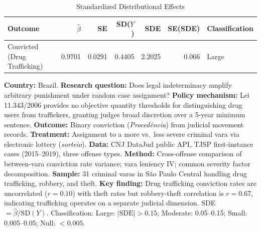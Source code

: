 \begin{table}[!h]
\centering
\caption{\label{tab:sde}Standardized Distributional Effects}
\centering
\begin{tabular}[t]{lrrrrrl}
\toprule
Outcome & $\hat{\beta}$ & SE & SD($Y$) & SDE & SE(SDE) & Classification\\
\midrule
Convicted (Drug Trafficking) & 0.9701 & 0.0291 & 0.4405 & 2.2025 & 0.066 & Large\\
\bottomrule
\end{tabular}
\end{table}
\begin{flushleft}\small
\textbf{Country:} Brazil. \textbf{Research question:} Does legal indeterminacy amplify arbitrary punishment under random case assignment? \textbf{Policy mechanism:} Lei 11.343/2006 provides no objective quantity thresholds for distinguishing drug users from traffickers, granting judges broad discretion over a 5-year minimum sentence. \textbf{Outcome:} Binary conviction (\textit{Proced\^encia}) from judicial movement records. \textbf{Treatment:} Assignment to a more vs.\ less severe criminal vara via electronic lottery (\textit{sorteio}). \textbf{Data:} CNJ DataJud public API, TJSP first-instance cases (2015--2019), three offense types. \textbf{Method:} Cross-offense comparison of between-vara conviction rate variance; vara leniency IV; common severity factor decomposition. \textbf{Sample:} 31 criminal varas in S\~ao Paulo Central handling drug trafficking, robbery, and theft. \textbf{Key finding:} Drug trafficking conviction rates are uncorrelated ($r = 0.10$) with theft rates but robbery-theft correlation is $r = 0.67$, indicating trafficking operates on a separate judicial dimension. SDE $= \hat{\beta} / \text{SD}(Y)$. Classification: Large: $|\text{SDE}| > 0.15$; Moderate: 0.05--0.15; Small: 0.005--0.05; Null: $< 0.005$.
\end{flushleft}
